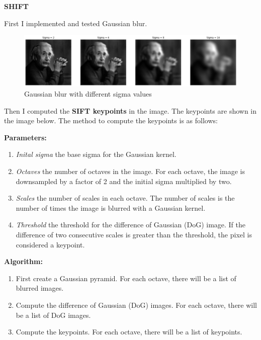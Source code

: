\textbf{SHIFT}

First I implemented and tested Gaussian blur.

\begin{figure}[H]
    \centering
    \includegraphics[width=1\textwidth]{res/blur.png}
    \caption{Gaussian blur with different sigma values}
    \label{fig:1.1}
\end{figure}

Then I computed the \textbf{SIFT keypoints} in the image. The keypoints are shown in the image below. The method to compute the keypoints is as follows:

\textbf{Parameters:}

\begin{enumerate}
    \item \textit{Inital sigma} the base sigma for the Gaussian kernel.
    \item \textit{Octaves} the number of octaves in the image. For each octave, the image is downsampled by a factor of 2 and the initial sigma multiplied by two.
    \item \textit{Scales} the number of scales in each octave. The number of scales is the number of times the image is blurred with a Gaussian kernel.
    \item \textit{Threshold} the threshold for the difference of Gaussian (DoG) image. If the difference of two consecutive scales is greater than the threshold, the pixel is considered a keypoint.
\end{enumerate}

\textbf{Algorithm:}

\begin{enumerate}
    \item First create a Gaussian pyramid. For each octave, there will be a list of blurred images.
    \item Compute the difference of Gaussian (DoG) images. For each octave, there will be a list of DoG images.
    \item Compute the keypoints. For each octave, there will be a list of keypoints.
\end{enumerate}

